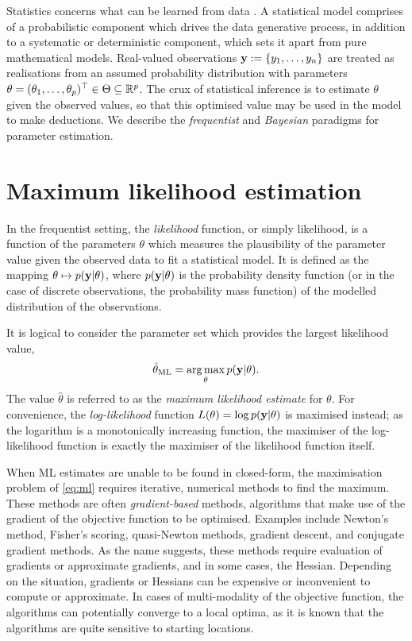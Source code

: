 Statistics concerns what can be learned from data \citep{davison2003statistical}.
A statistical model comprises of a probabilistic component which drives the data generative process, in addition to a systematic or deterministic component, which sets it apart from pure mathematical models.
Real-valued observations ${\mathbf y} := \{y_1,\dots,y_n\}$ are treated as realisations from an assumed probability distribution with parameters $\theta = (\theta_1,\dots,\theta_p)^\top \in \Theta \subseteq \mathbb{R}^p$.
The crux of statistical inference is to estimate $\theta$ given the observed values, so that this optimised value may be used in the model to make deductions.
We describe the \emph{frequentist} and \emph{Bayesian} paradigms for parameter estimation.

\section{Maximum likelihood estimation}

In the frequentist setting, the \emph{likelihood} function, or simply likelihood, is a function of the parameters $\theta$ which measures the plausibility of the parameter value given the observed data to fit a statistical model.
It is defined as the mapping $\theta \mapsto p({\mathbf y}|\theta)$, where $p({\mathbf y}|\theta)$ is the probability density function (or in the case of discrete observations, the probability mass function) of the modelled distribution of the observations.
 
It is logical to consider the parameter set which provides the largest likelihood value,
\begin{equation}\label{eq:ml}
  \hat\theta_{\text{ML}} = \operatorname*{arg\,max}_\theta p({\mathbf y}|\theta).
\end{equation}
The value $\hat\theta$ is referred to as the \emph{maximum likelihood estimate} for $\theta$.
For convenience, the \emph{log-likelihood} function $L(\theta) = \log p({\mathbf y}|\theta)$ is maximised instead; as the logarithm is a monotonically increasing function, the maximiser of the log-likelihood function is exactly the maximiser of the likelihood function itself.

When ML estimates are unable to be found in closed-form, the maximisation problem of \cref{eq:ml} requires iterative, numerical methods to find the maximum.
These methods are often \emph{gradient-based} methods, algorithms that make use of the gradient of the objective function to be optimised.
Examples include Newton's method, Fisher's scoring, quasi-Newton methods, gradient descent, and conjugate gradient methods.
As the name suggests, these methods require evaluation of gradients or approximate gradients, and in some cases, the Hessian.
Depending on the situation, gradients or Hessians can be expensive or inconvenient to compute or approximate.
In cases of multi-modality of the objective function, the algorithms can potentially converge to a local optima, as it is known that the algorithms are quite sensitive to starting locations.

